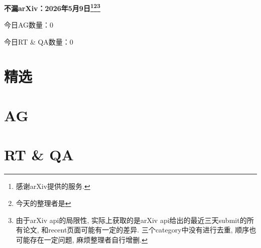 \documentclass[9pt, a4paper]{article}
\theoremstyle{plain}
\theoremstyle{definition}
\theoremstyle{remark}
\newcommand{\AGnumber}{0}
\newcommand{\RTQAnumber}{0}
\newcommand{\NewestDate}{2026年5月9日}
\newcommand{\todayarXiver}{} %
\begin{document}
\begin{center}
    \Huge\textbf{不漏arXiv：\NewestDate\footnote{感谢arXiv提供的服务.}\footnote{今天的整理者是\todayarXiver}\footnote{由于arXiv api的局限性, 实际上获取的是arXiv api给出的最近三天submit的所有论文, 和recent页面可能有一定的差异. 三个category中没有进行去重, 顺序也可能存在一定问题, 麻烦整理者自行增删.}} \\
\end{center}

\setcounter{section}{-1}

\begin{center}
    今日AG数量：\AGnumber
    
    今日RT \& QA数量：\RTQAnumber
    
\end{center}


\section{精选}


\section{AG}

\section{RT \& QA}
\end{document}
